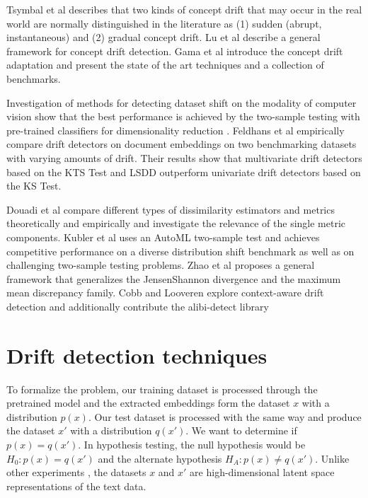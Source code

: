\documentclass[12pt]{report}
\begin{document}
Tsymbal et al \cite{tsymbalProblemConceptDrift} describes that two kinds of concept drift that may occur in the real world are normally distinguished in the literature as (1) sudden (abrupt, instantaneous) and (2) gradual concept drift.
Lu et al \cite{luLearningConceptDrift2018} describe a general framework for concept drift detection.
Gama et al \cite{gamajoaoSurveyConceptDrift2014} introduce the concept drift adaptation and present the state of the art techniques and a collection of benchmarks.

Investigation of methods for detecting dataset shift on the modality of computer vision show that the best performance is achieved by the two-sample testing with pre-trained classifiers for dimensionality reduction \cite{rabanserFailingLoudlyEmpirical2019a}.
Feldhans et al \cite{feldhansDriftDetectionText2021} empirically compare drift detectors on document embeddings on two benchmarking datasets with varying amounts of drift. Their results show that multivariate drift detectors based on the KTS Test and LSDD outperform univariate drift detectors based on the KS Test.

Douadi et al \cite{bouadiAdvancesIntelligentData2022} compare different types of dissimilarity estimators and metrics theoretically and empirically and investigate the relevance of the single metric components.
Kubler et al \cite{kublerAutoMLTwoSampleTest2022} uses an AutoML two-sample test and achieves competitive performance on a diverse distribution shift benchmark as well as on challenging two-sample testing problems.
Zhao et al \cite{zhaoComparingDistributionsMeasuring2022} proposes a general framework that generalizes the JensenShannon divergence and the maximum mean discrepancy family.
Cobb and Looveren explore context-aware drift detection \cite{cobbContextAwareDriftDetection2022} and additionally contribute the alibi-detect library \cite{vanlooverenAlibiDetectAlgorithms2022}

\chapter{Drift detection techniques}

To formalize the problem, our training dataset is processed through the pretrained model and the extracted embeddings form the dataset \(x\) with a distribution \(p(x)\).
Our test dataset is processed with the same way and produce the dataset \(x'\) with a distribution \(q(x')\).
We want to determine if \(p(x)=q(x')\).
In hypothesis testing, the null hypothesis would be \(H_0: p(x)=q(x')\) and the alternate hypothesis \(H_A: p(x) \neq q(x') \).
Unlike other experiments \cite{rabanserFailingLoudlyEmpirical2019a}, the datasets \(x\) and \(x'\) are high-dimensional latent space representations of the text data.
\end{document}
